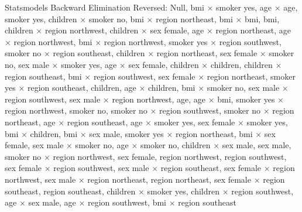 \documentclass{article}
\begin{document}
Statsmodels Backward Elimination Reversed: Null, bmi $\times$ smoker yes, age $\times$ age, smoker yes, children $\times$ smoker no, bmi $\times$ region northeast, bmi $\times$ bmi, bmi, children $\times$ region northwest, children $\times$ sex female, age $\times$ region northeast, age $\times$ region northwest, bmi $\times$ region northwest, smoker yes $\times$ region southwest, smoker no $\times$ region southeast, children $\times$ region northeast, sex female $\times$ smoker no, sex male $\times$ smoker yes, age $\times$ sex female, children $\times$ children, children $\times$ region southeast, bmi $\times$ region southwest, sex female $\times$ region northeast, smoker yes $\times$ region southeast, children, age $\times$ children, bmi $\times$ smoker no, sex male $\times$ region southwest, sex male $\times$ region northwest, age, age $\times$ bmi, smoker yes $\times$ region northwest, smoker no, smoker no $\times$ region southwest, smoker no $\times$ region northeast, age $\times$ region southeast, age $\times$ smoker yes, sex female $\times$ smoker yes, bmi $\times$ children, bmi $\times$ sex male, smoker yes $\times$ region northeast, bmi $\times$ sex female, sex male $\times$ smoker no, age $\times$ smoker no, children $\times$ sex male, sex male, smoker no $\times$ region northwest, sex female, region northwest, region southwest, sex female $\times$ region southwest, sex male $\times$ region southeast, sex female $\times$ region northwest, sex male $\times$ region northeast, region northeast, sex female $\times$ region southeast, region southeast, children $\times$ smoker yes, children $\times$ region southwest, age $\times$ sex male, age $\times$ region southwest, bmi $\times$ region southeast
\end{document}
